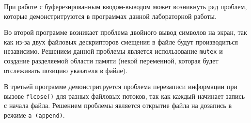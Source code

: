 При работе с буферезированным вводом-выводом может возникнуть ряд проблем, которые демонстритруются в программах данной лабораторной работы. 

Во второй программе возникает проблема двойного вывод символов на экран, так как из-за двух файловых дескрипторов смещения в файле будут производиться независимо. Решением данной проблемы является использование \texttt{mutex} и создание разделяемой области памяти (некой переменной, которая будет отслеживать позицию указателя в файле).

В третьей программе демонстритруется проблема перезаписи информации при вызове \texttt{flcose()} для разных файловых потоков, так как каждый начинает запись с начала файла. Решением проблемы является открытие файла на дозапись в режиме \texttt{a (append)}.
